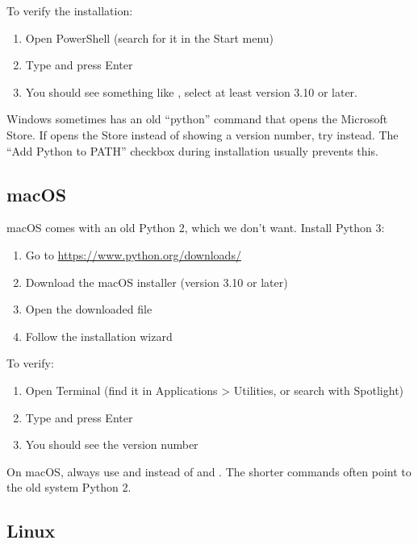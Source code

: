 To verify the installation:
\begin{enumerate}
    \item Open PowerShell (search for it in the Start menu)
    \item Type  and press Enter
    \item You should see something like , select at least version 3.10 or later.
\end{enumerate}

\begin{warning}
Windows sometimes has an old ``python'' command that opens the Microsoft Store. If  opens the Store instead of showing a version number, try  instead. The ``Add Python to PATH'' checkbox during installation usually prevents this.
\end{warning}

\subsection{macOS}

macOS comes with an old Python 2, which we don't want. Install Python 3:

\begin{enumerate}
    \item Go to \url{https://www.python.org/downloads/}
    \item Download the macOS installer (version 3.10 or later)
    \item Open the downloaded  file
    \item Follow the installation wizard
\end{enumerate}

To verify:
\begin{enumerate}
    \item Open Terminal (find it in Applications > Utilities, or search with Spotlight)
    \item Type  and press Enter
    \item You should see the version number
\end{enumerate}

\begin{note}
On macOS, always use  and  instead of  and . The shorter commands often point to the old system Python 2.
\end{note}

\subsection{Linux}

